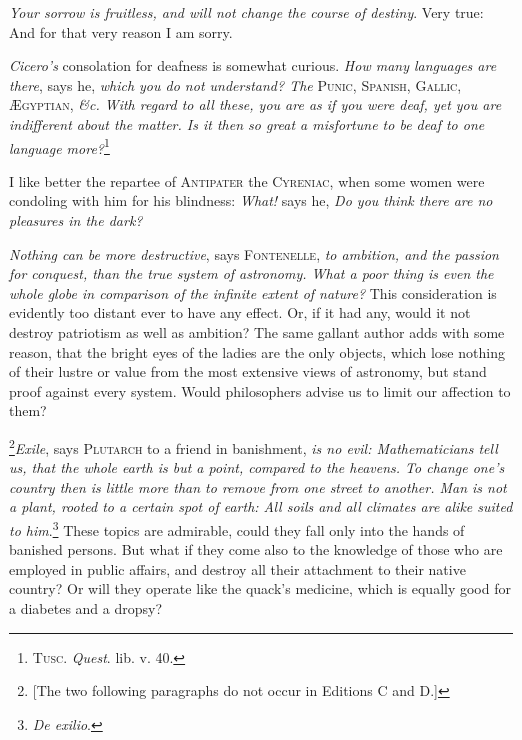 \textit{Your sorrow is fruitless, and will not change the course of
destiny}. Very true: And for that very reason I am sorry.

\textit{Cicero's} consolation for deafness is somewhat curious.
\textit{How many languages are there}, says he, \textit{which you do
not understand? The} \textsc{Punic}, \textsc{Spanish},
\textsc{Gallic}, \textsc{\AE gyptian}, \textit{\&c. With regard to all
these, you are as if you were deaf, yet you are indifferent about the
matter. Is it then so great a misfortune to be deaf to one language
more?}\footnote{\textsc{Tusc}. \textit{Quest}. lib. v. 40.}

I like better the repartee of \textsc{Antipater} the
\textsc{Cyreniac}, when some women were condoling with him for his
blindness: \textit{What!} says he, \textit{Do you think there are no
pleasures in the dark?}

\textit{Nothing can be more destructive}, says \textsc{Fontenelle},
\textit{to ambition, and the passion for conquest, than the true
system of  astronomy. What a poor thing is even the whole
globe in comparison of the infinite extent of nature?} This
consideration is evidently too distant ever to have any effect. Or, if
it had any, would it not destroy patriotism as well as ambition? The
same gallant author adds with some reason, that the bright eyes of the
ladies are the only objects, which lose nothing of their lustre or
value from the most extensive views of astronomy, but stand proof
against every system. Would philosophers advise us to limit our
affection to them?

\footnote{[The two following paragraphs do not occur in Editions C and
D.]}\textit{Exile}, says \textsc{Plutarch} to a friend in banishment,
\textit{is no evil: Mathematicians tell us, that the whole earth is
but a point, compared to the heavens. To change one's country then is
little more than to remove from one street to another. Man is not a
plant, rooted to a certain spot of earth: All soils and all climates
are alike suited to him}.\footnote{\textit{De exilio}.} These topics
are admirable, could they fall only into the hands of banished
persons. But what if they come also to the knowledge of those who are
employed in public affairs, and destroy all their attachment to their
native country? Or will they operate like the quack's medicine, which
is equally good for a diabetes and a dropsy?

